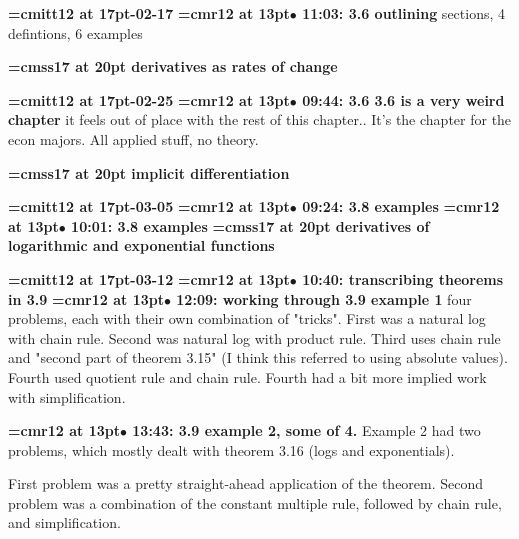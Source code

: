 {\medskip\noindent\bf\font\titlefont=cmitt12 at 17pt-02-17}\medskip
{\smallskip\noindent\bf\font\titlefont=cmr12 at 13pt\titlefont $\bullet$ 11:03: 3.6 outlining} sections, 4 defintions, 6 examples
\par

{\medskip\noindent\bf\font\titlefont=cmss17 at 20pt derivatives as rates of change}\medskip

{\medskip\noindent\bf\font\titlefont=cmitt12 at 17pt-02-25}\medskip
{\smallskip\noindent\bf\font\titlefont=cmr12 at 13pt\titlefont $\bullet$ 09:44: 3.6 3.6 is a very weird chapter}\smallskip
it feels out of place with the rest of this chapter.. It's the chapter for the econ majors. All applied stuff, no theory.
\par

{\medskip\noindent\bf\font\titlefont=cmss17 at 20pt implicit differentiation}\medskip

{\medskip\noindent\bf\font\titlefont=cmitt12 at 17pt-03-05}\medskip
{\smallskip\noindent\bf\font\titlefont=cmr12 at 13pt\titlefont $\bullet$ 09:24: 3.8 examples}\smallskip
{\smallskip\noindent\bf\font\titlefont=cmr12 at 13pt\titlefont $\bullet$ 10:01: 3.8 examples}\smallskip
{}
{\medskip\noindent\bf\font\titlefont=cmss17 at 20pt derivatives of logarithmic and exponential functions}\medskip

{\medskip\noindent\bf\font\titlefont=cmitt12 at 17pt-03-12}\medskip
{\smallskip\noindent\bf\font\titlefont=cmr12 at 13pt\titlefont $\bullet$ 10:40: transcribing theorems in 3.9}\smallskip
{\smallskip\noindent\bf\font\titlefont=cmr12 at 13pt\titlefont $\bullet$ 12:09: working through 3.9 example 1}\smallskip
four problems, each with their own combination of "tricks". First was a natural log with chain rule. Second was natural log with product rule. Third uses chain rule and "second part of theorem 3.15" (I think this referred to using absolute values). Fourth used quotient rule and chain rule. Fourth had a bit more implied work with simplification.
\par

{\smallskip\noindent\bf\font\titlefont=cmr12 at 13pt\titlefont $\bullet$ 13:43: 3.9 example 2, some of 4.}\smallskip
Example 2 had two problems, which mostly dealt with theorem 3.16 (logs and exponentials).
\par

First problem was a pretty straight-ahead application of the theorem. Second problem was a combination of the constant multiple rule, followed by chain rule, and simplification.
\par

